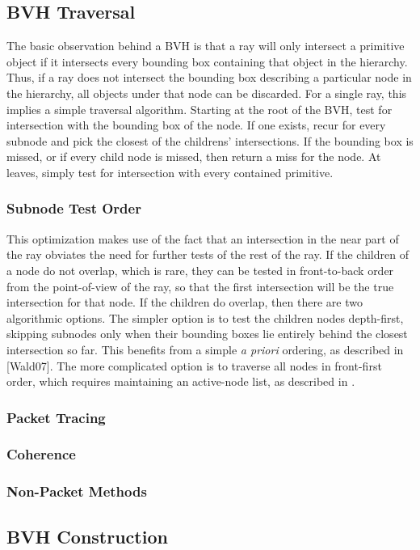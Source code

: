 \documentclass{article}
\begin{document}
\subsection{BVH Traversal}
The basic observation behind a BVH is that a ray will only intersect a primitive object if it intersects every bounding box containing that object in the hierarchy.  Thus, if a ray does not intersect the bounding box describing a particular node in the hierarchy, all objects under that node can be discarded.  For a single ray, this implies a simple traversal algorithm.  Starting at the root of the BVH, test for intersection with the bounding box of the node.  If one exists, recur for every subnode and pick the closest of the childrens' intersections.  If the bounding box is missed, or if every child node is missed, then return a miss for the node.  At leaves, simply test for intersection with every contained primitive.  
\subsubsection{Subnode Test Order}
This optimization makes use of the fact that an intersection in the near part of the ray obviates the need for further tests of the rest of the ray.  If the children of a node do not overlap, which is rare, they can be tested in front-to-back order from the point-of-view of the ray, so that the first intersection will be the true intersection for that node.  If the children do overlap, then there are two algorithmic options.  The simpler option is to test the children nodes depth-first, skipping subnodes only when their bounding boxes lie entirely behind the closest intersection so far.  This benefits from a simple {\it a priori} ordering, as described in [Wald07].  The more complicated option is to traverse all nodes in front-first order, which requires maintaining an active-node list, as described in \cite{Wald08}. 
\subsubsection{Packet Tracing}

\subsubsection{Coherence}
\subsubsection{Non-Packet Methods}
\subsection{BVH Construction}
\end{document}
